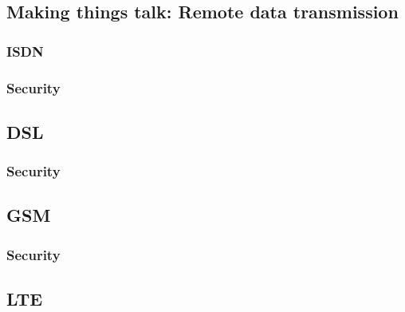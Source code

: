 \subsection{Making things talk: Remote data transmission}

\subsubsection{ISDN}
\subsubsection{Security}

\subsection{DSL}
\subsubsection{Security}

\subsection{GSM}
\subsubsection{Security}

\subsection{LTE}
